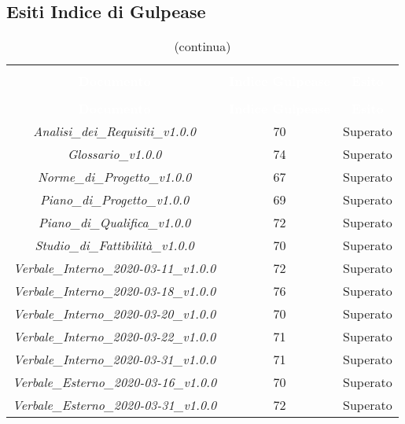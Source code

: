 \subsection{Esiti Indice di Gulpease}
\begin{longtable}{c c c}
\rowcolor{white}\caption{Esiti verifica documenti con Indice di Gulpease} \\
		\rowcolor{redafk}
\textcolor{white}{\textbf{Documento}} &
\textcolor{white}{\textbf{Indice Gulpease}} &
\textcolor{white}{\textbf{Esito}} \\
		\endfirsthead
		\rowcolor{white}\caption[]{(continua)} \\
		\rowcolor{redafk}
\textcolor{white}{\textbf{Documento}} &
\textcolor{white}{\textbf{Indice Gulpease}} &
\textcolor{white}{\textbf{Esito}} \\
		\endhead
		\textit{Analisi\_dei\_Requisiti\_v1.0.0} & 70 & Superato \\
		\textit{Glossario\_v1.0.0} & 74 & Superato \\
		\textit{Norme\_di\_Progetto\_v1.0.0} & 67 & Superato \\
		\textit{Piano\_di\_Progetto\_v1.0.0} & 69 & Superato \\
		\textit{Piano\_di\_Qualifica\_v1.0.0} & 72 & Superato \\
		\textit{Studio\_di\_Fattibilità\_v1.0.0} & 70 & Superato \\
		\textit{Verbale\_Interno\_2020-03-11\_v1.0.0} & 72 & Superato \\
		\textit{Verbale\_Interno\_2020-03-18\_v1.0.0} & 76 & Superato \\
		\textit{Verbale\_Interno\_2020-03-20\_v1.0.0} & 70 & Superato \\
		\textit{Verbale\_Interno\_2020-03-22\_v1.0.0} & 71 & Superato \\
		\textit{Verbale\_Interno\_2020-03-31\_v1.0.0} & 71 & Superato \\
		\textit{Verbale\_Esterno\_2020-03-16\_v1.0.0} & 70 & Superato \\
		\textit{Verbale\_Esterno\_2020-03-31\_v1.0.0} & 72 & Superato \\
\end{longtable}
